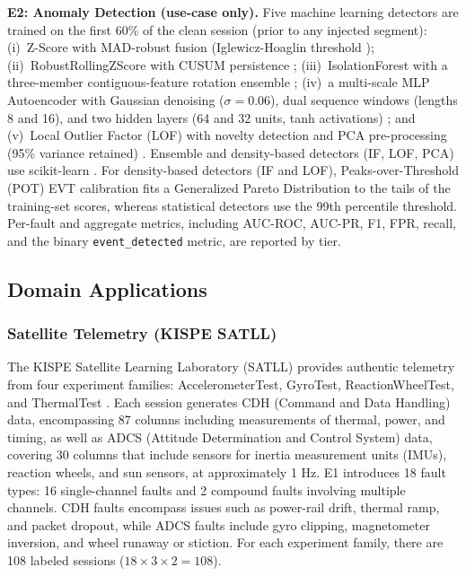 \documentclass[conference]{IEEEtran}
\begin{document}
\textbf{E2: Anomaly Detection (use-case only).} Five machine learning detectors are trained on the first 60\% of the clean session (prior to any injected segment): (i)~Z-Score with MAD-robust fusion (Iglewicz-Hoaglin threshold \cite{iglewicz1993outliers}); (ii)~RobustRollingZScore with CUSUM persistence \cite{page1954cusum}; (iii)~IsolationForest with a three-member contiguous-feature rotation ensemble \cite{liu2008isolation}; (iv)~a multi-scale MLP Autoencoder with Gaussian denoising ($\sigma=0.06$), dual sequence windows (lengths 8 and 16), and two hidden layers (64 and 32 units, tanh activations) \cite{sakurada2014autoencoder}; and (v)~Local Outlier Factor (LOF) with novelty detection and PCA pre-processing (95\% variance retained) \cite{breunig2000lof}. Ensemble and density-based detectors (IF, LOF, PCA) use scikit-learn \cite{pedregosa2011sklearn}. For density-based detectors (IF and LOF), Peaks-over-Threshold (POT) EVT calibration \cite{siffer2017evt} fits a Generalized Pareto Distribution to the tails of the training-set scores, whereas statistical detectors use the 99th percentile threshold. Per-fault and aggregate metrics, including AUC-ROC, AUC-PR, F1, FPR, recall, and the binary \texttt{event\_detected} metric, are reported by tier.

\subsection{Domain Applications}

\subsubsection{Satellite Telemetry (KISPE SATLL)}

The KISPE Satellite Learning Laboratory (SATLL) provides authentic telemetry from four experiment families: AccelerometerTest, GyroTest, ReactionWheelTest, and ThermalTest \cite{kispe_satll}. Each session generates CDH (Command and Data Handling) data, encompassing 87 columns including measurements of thermal, power, and timing, as well as ADCS (Attitude Determination and Control System) data, covering 30 columns that include sensors for inertia measurement units (IMUs), reaction wheels, and sun sensors, at approximately 1 Hz. E1 introduces 18 fault types: 16 single-channel faults and 2 compound faults involving multiple channels. CDH faults encompass issues such as power-rail drift, thermal ramp, and packet dropout, while ADCS faults include gyro clipping, magnetometer inversion, and wheel runaway or stiction. For each experiment family, there are 108 labeled sessions ($18 \times 3 \times 2 = 108$).
\end{document}
